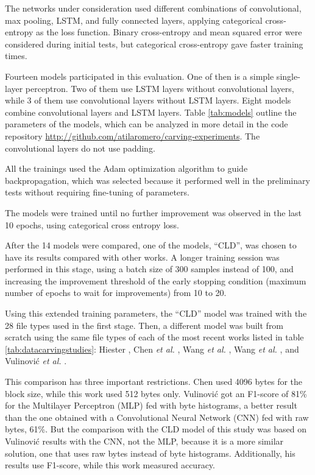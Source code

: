 The networks under consideration used different combinations of convolutional, max pooling, LSTM, and fully connected layers, applying categorical cross-entropy as the loss function. Binary cross-entropy and mean squared error were considered during initial tests, but categorical cross-entropy gave faster training times.

Fourteen models participated in this evaluation. One of then is a simple single-layer perceptron. Two of them use LSTM layers without convolutional layers, while 3 of them use convolutional layers without LSTM layers. Eight models combine convolutional layers and LSTM layers. Table \ref{tab:models} outline the parameters of the models, which can be analyzed in more detail in the code repository \sloppy\url{http://github.com/atilaromero/carving-experiments}. The convolutional layers do not use padding. 



All the trainings used the Adam \cite{kingma_adam:_2014}
optimization algorithm to guide backpropagation, which was selected because it performed well in the preliminary tests without requiring fine-tuning of parameters.

The models were trained until no further improvement was observed in the last 10 epochs, using categorical cross entropy loss.

After the 14 models were compared, one of the models, ``CLD'', was chosen to have its results compared with other works. A longer training session was performed in this stage, using a batch size of 300 samples instead of 100, and increasing the improvement threshold of the early stopping condition (maximum number of epochs to wait for improvements) from 10 to 20.

Using this extended training parameters, the ``CLD'' model was trained with the 28 file types used in the first stage. Then, a different model was built from scratch using the same file types of each of the most recent works listed in table \ref{tab:datacarvingstudies}: 
Hiester \cite{hiester_file_2018}, 
Chen \textit{et al.} \cite{chen_file_2018},
Wang \textit{et al.} \cite{wang_sparse_2018},
Wang \textit{et al.} \cite{wang_file_2018},
and
Vulinović \textit{et al.} \cite{vulinovic_neural_2019}.

This comparison has three important restrictions.
Chen used 4096 bytes for the block size, while this work used 512 bytes only.
Vulinović got an F1-score of 81\% for the Multilayer Perceptron (MLP) fed with byte histograms, a better result than the one obtained with a Convolutional Neural Network (CNN) fed with raw bytes, 61\%. But the comparison with the CLD model of this study was based on Vulinović results with the CNN, not the MLP, because it is a more similar solution, one that uses raw bytes instead of byte histograms. Additionally, his results use F1-score, while this work measured accuracy. 

